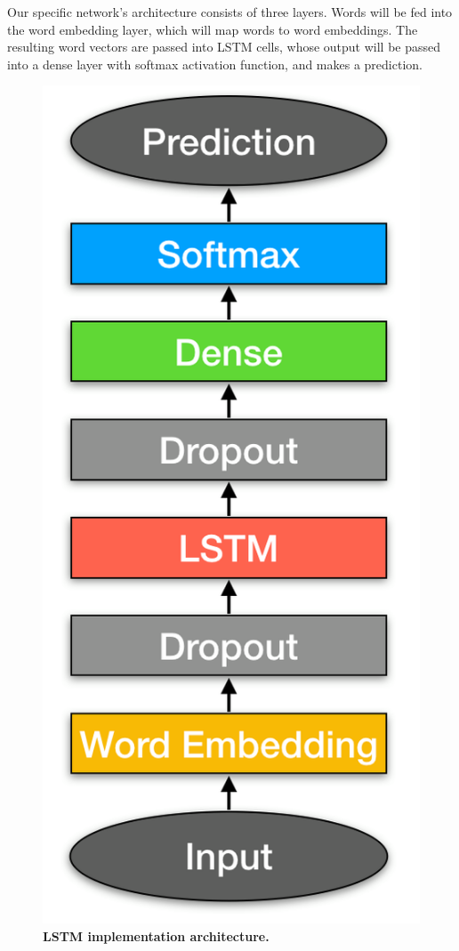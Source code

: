 \documentclass[11pt,a4paper]{article}
\begin{document}
Our specific network's architecture consists of three layers. Words will be fed into the word embedding layer, which will map words to word embeddings. The resulting word vectors are passed into LSTM cells, whose output will be passed into a dense layer with softmax activation function, and makes a prediction.
\begin{figure}[H]
	\centering\includegraphics[scale=0.3]{architecture} 
	\caption{\textbf{ LSTM implementation architecture.}}
\end{figure}
\end{document}
